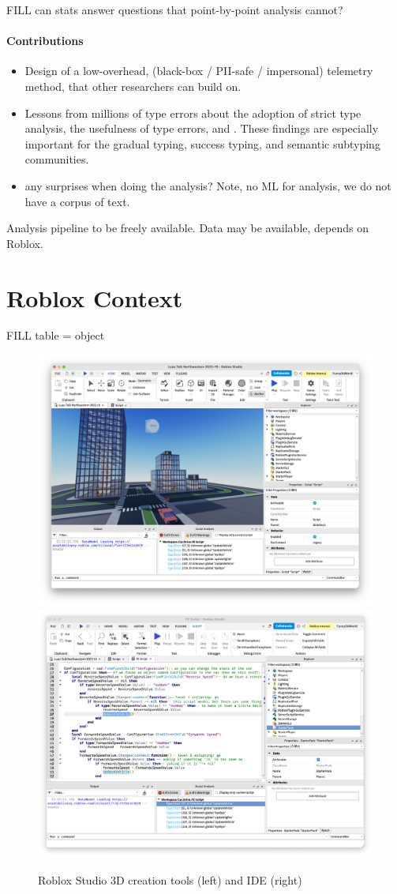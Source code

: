 \documentclass[english,submission,cleveref]{programming}
\begin{document}
FILL can stats answer questions that point-by-point analysis cannot?

\paragraph{Contributions}
\begin{itemize}
  \item
    Design of a low-overhead, (black-box / PII-safe / impersonal)
    telemetry method, that other
    researchers can build on.

  \item
    Lessons from millions of type errors about
    the adoption of strict type analysis,
    the usefulness of type errors,
    and \FILL{}.
    These findings are especially important for the
    gradual typing, success typing, and semantic subtyping communities.

  \item
    \FILL{} any surprises when doing the analysis?
    Note, no ML for analysis, we do not have a corpus of text.

\end{itemize}

Analysis pipeline to be freely available.
Data may be available, depends on Roblox.


\section{{Roblox} Context}

FILL table = object

\begin{figure}

  \includegraphics[width=.45\textwidth]{img/roblox-studio.png}
  \includegraphics[width=.45\textwidth]{img/roblox-studio-ide.png}

  \caption{{Roblox Studio 3D creation} tools (left) and IDE (right)}
  \label{fig:roblox-studio}
\end{figure}
\end{document}
